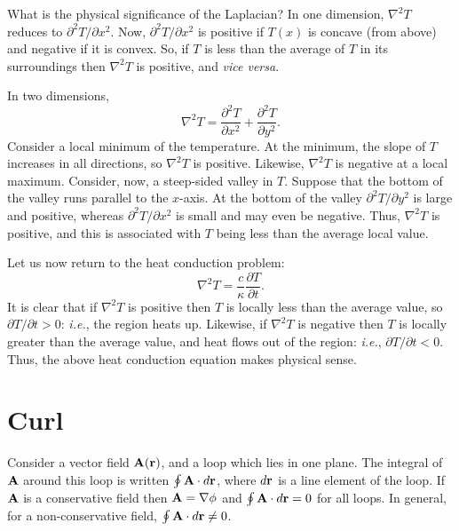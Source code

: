 What is the physical significance of the Laplacian? In one dimension,
$\nabla^2 T$ reduces to $\partial^2 T/\partial x^2$.
Now, $\partial^2 T/\partial x^2$ is positive if $T(x)$ is
concave (from above) and negative if it is convex. So, if $T$ is less than the
average of $T$ in its surroundings then $\nabla^2 T$ is positive, and {\em vice
versa}. 

In two dimensions,
\begin{equation}
\nabla^2 T = \frac{\partial^2 T}{\partial x^2}+ \frac{\partial ^2 T}{\partial y^2}.
\end{equation}
Consider a local minimum of the temperature.
At the minimum, the slope of $T$ increases in all directions, so $\nabla^2 T$ is
positive. Likewise, $\nabla^2 T$ is negative at
 a local maximum.
Consider, now, a steep-sided valley in $T$. Suppose that the bottom of the
valley runs parallel to the $x$-axis. 
At the bottom of the
valley  $\partial^2 T/\partial y^2$ is large and positive, whereas
$\partial^2 T/\partial x^2$ is small and may even be negative. Thus, $\nabla^2 T$
is positive, and this is associated with $T$ being less than the average local
value.

Let us now return to the heat conduction problem:
\begin{equation}
\nabla^2 T = \frac{c}{\kappa} \frac{\partial T}{\partial t}.
\end{equation}
It is clear that if $\nabla^2 T$ is positive then $T$ is locally less than the
average value, so $\partial T/\partial t>0$: {\em i.e.}, the region heats up.
Likewise, if $\nabla^2 T$ is negative then $T$ is locally greater than the average
value, and heat flows out of the region: {\em i.e.}, $\partial T/\partial t<0$. Thus,
the above heat conduction equation makes physical sense.

\section{Curl}\label{scurl}
Consider a vector field ${\bf A}({\bf r})$, and a loop  which lies in one plane. 
The integral of ${\bf A}$ around this loop is written
$\oint {\bf A}\cdot d{\bf r}$, where $d{\bf r}$ is a line element of the
loop. If ${\bf A}$ is a conservative field then 
${\bf A}= \nabla \phi$ and $\oint {\bf A}\cdot d{\bf r}=0$
for all loops. In general, for a non-conservative field, $\oint {\bf A}\cdot d{\bf r}\neq 0$.

